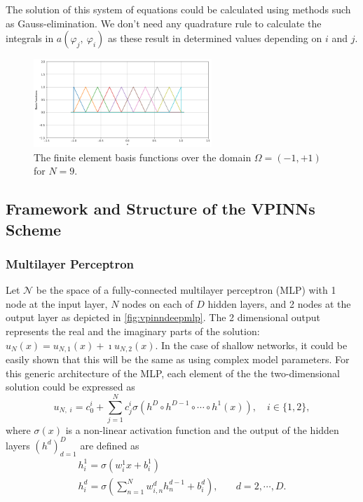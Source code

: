 The solution of this system of equations could be calculated using methods such as Gauss-elimination. We don't need any quadrature rule to calculate the integrals in $a(\varphi_j,\:\varphi_i)$ as these result in determined values depending on $i$ and $j$.

\begin{figure}[h]
    \centering
    \includegraphics[width = 0.6\textwidth]{img/FEMBasisFunctions.png}
    \caption{The finite element basis functions over the domain $\Omega = (-1,+1)$ for $N=9$.}
    \label{fig:fembases}
\end{figure}

\subsection{Framework and Structure of the VPINNs Scheme}\label{sec:vpinnsframework}

\subsubsection{Multilayer Perceptron}\label{sec:vpinnsmlp}
Let $\mathcal{N}$ be the space of a fully-connected multilayer perceptron (MLP) with 1 node at the input layer, $N$ nodes on each of $D$ hidden layers, and 2 nodes at the output layer as depicted in \autoref{fig:vpinndeepmlp}. The 2 dimensional output represents the real and the imaginary parts of the solution: $u_N(x) = u_{N,1}(x) + \imath u_{N,2}(x)$. In the case of shallow networks, it could be easily shown that this will be the same as using complex model parameters. For this generic architecture of the MLP, each element of the the two-dimensional solution could be expressed as
\begin{equation}
    \label{eq:vpinngeneric}
    u_{N,\;i} = c_0^i + \sum_{j=1}^{N}{c_j^i \sigma(h^{D} \circ h^{D-1} \circ \cdots \circ h^1(x))}, \quad i \in \{1, 2\},
\end{equation}
where $\sigma (x)$ is a non-linear activation function and the output of the hidden layers ${(h^d)}_{d=1}^{D}$ are defined as
\begin{equation}
    \begin{aligned}
        h^1_i = \sigma(w^1_i x + b^1_i)& \\
        h^d_i = \sigma(\sum_{n=1}^{N}{w^d_{i, n} h^{d-1}_n} + b^d_i),& \quad d = 2, \cdots, D.
    \end{aligned}
\end{equation}


